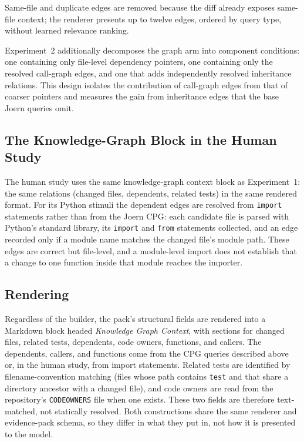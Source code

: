 Same-file and duplicate edges are removed because the diff already exposes
same-file context; the renderer presents up to twelve edges, ordered by
query type, without learned relevance ranking.

Experiment~2 additionally decomposes the graph arm into component
conditions: one containing only file-level dependency pointers, one
containing only the resolved call-graph edges, and one that adds
independently resolved inheritance relations. This design isolates the
contribution of call-graph edges from that of coarser pointers and measures
the gain from inheritance edges that the base Joern queries omit.

\subsection{The Knowledge-Graph Block in the Human Study}
\label{sec:approach-kg-ast}

The human study uses the same knowledge-graph context block as
Experiment~1: the same relations (changed files, dependents, related tests)
in the same rendered format. For its Python stimuli the dependent edges are
resolved from \texttt{import} statements rather than from the Joern CPG:
each candidate file is parsed with Python's standard library, its
\texttt{import} and \texttt{from} statements collected, and an edge
recorded only if a module name matches the changed file's module path. These edges are correct but file-level, and a
module-level import does not establish that a change to one function inside
that module reaches the importer.

\subsection{Rendering}
\label{sec:approach-kg-render}

Regardless of the builder, the pack's structural fields are rendered into a
Markdown block headed \emph{Knowledge Graph Context}, with sections for
changed files, related tests, dependents, code owners, functions, and callers.
The dependents, callers, and functions come from the CPG queries described
above or, in the human study, from import statements. Related tests are identified by filename-convention
matching (files whose path contains \texttt{test} and that share a directory
ancestor with a changed file), and code owners are read from the repository's
\texttt{CODEOWNERS} file when one exists. These two fields are therefore
text-matched, not statically resolved. Both constructions share the same
renderer and evidence-pack schema, so they differ in what they put in, not
how it is presented to the model.


